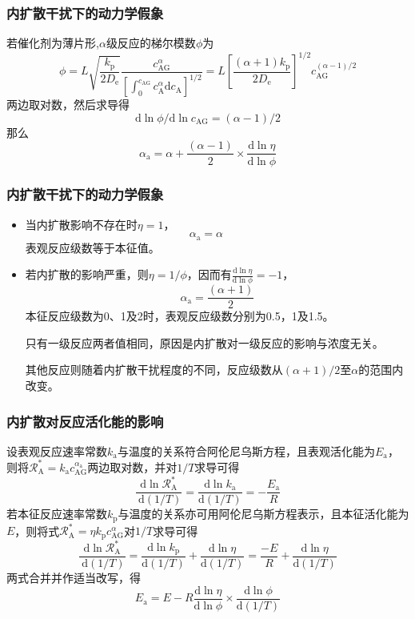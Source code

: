 \begin{frame}
    \frametitle{内扩散干扰下的动力学假象}

    若催化剂为薄片形,$\alpha$级反应的梯尔模数$\phi$为
    \[
        \phi=L \sqrt{\frac{k_{\mathrm{p}}}{2 D_{\mathrm{e}}}} \frac{c_\mathrm{AG}^{\alpha}}{\left[\int_{0}^{c_{\mathrm{AG}}} c_{\mathrm{A}}^{\alpha} \mathrm{d} c_{\mathrm{A}}\right]^{1 / 2}}=L\left[\frac{(\alpha+1) k_{\mathrm{p}}}{2 D_{\mathrm{e}}}\right]^{1 / 2} c_{\mathrm{AG}}^{(\alpha-1) / 2}
    \]
    两边取对数，然后求导得
    \[
        \mathrm{d} \ln \phi / \mathrm{d} \ln c_{\mathrm{AG}}=(\alpha-1) / 2
    \]
    那么
    \[
        \alpha_{\mathrm{a}}=\alpha+\frac{(\alpha-1)}{2} \times \frac{\mathrm{d} \ln \eta}{\mathrm{d} \ln \phi}
    \]
    

\end{frame}


\begin{frame}
    \frametitle{内扩散干扰下的动力学假象}

    \begin{itemize}
        \item 当内扩散影响不存在时$\eta =1$，        
        \[
            \alpha_{\mathrm{a}}=\alpha \qquad
        \]
        表观反应级数等于本征值。
        \item 若内扩散的影响严重，则$\eta =1/\phi$，因而有$\frac{\mathrm{d} \ln \eta}{\mathrm{d} \ln \phi} = -1$，        
        \[
            \alpha_{\mathrm{a}}= \frac{(\alpha+1)}{2}
        \]        
        本征反应级数为0、1及2时，表观反应级数分别为0.5，1及1.5。

        只有一级反应两者值相同，原因是内扩散对一级反应的影响与浓度无关。
        
        其他反应则随着内扩散干扰程度的不同，反应级数从$(\alpha+1)/2$至$\alpha$的范围内改变。
    \end{itemize}

\end{frame}


\begin{frame}
    \frametitle{内扩散对反应活化能的影响}

    设表观反应速率常数$k_\mathrm{a}$与温度的关系符合阿伦尼乌斯方程，且表观活化能为$E_\mathrm{a}$，则将$\mathscr{R}_{\mathrm{A}}^{*}=k_{\mathrm{a}} c_{\mathrm{AG}}^{\alpha_\mathrm{a}}$两边取对数，并对$1/T$求导可得
    \[
        \frac{\mathrm{d} \ln \mathscr{R}_{\mathrm{A}}^{*}}{\mathrm{~d}(1 / T)}=\frac{\mathrm{d} \ln k_{\mathrm{a}}}{\mathrm{d}(1 / T)}=-\frac{E_{\mathrm{a}}}{R}
    \]
    若本征反应速率常数$k_\mathrm{p}$与温度的关系亦可用阿伦尼乌斯方程表示，且本征活化能为$E$，则将式$\mathscr{R}_{\mathrm{A}}^{*}=\eta k_{\mathrm{p}} c_{\mathrm{AG}}^\alpha$对$1/T$求导可得
    \[
        \frac{\mathrm{d} \ln \mathscr{R}_{\mathrm{A}}^{*}}{\mathrm{~d}(1 / T)}=\frac{\mathrm{d} \ln k_{\mathrm{p}}}{\mathrm{d}(1 / T)}+\frac{\mathrm{d} \ln \eta}{\mathrm{d}(1 / T)}=\frac{-E}{R}+\frac{\mathrm{d} \ln \eta}{\mathrm{d}(1 / T)}
    \]
    两式合并并作适当改写，得
    \[
        E_{\mathrm{a}}=E-R \frac{\mathrm{d} \ln \eta}{\mathrm{d} \ln \phi} \times \frac{\mathrm{d} \ln \phi}{\mathrm{d}(1 / T)}
    \]

\end{frame}


